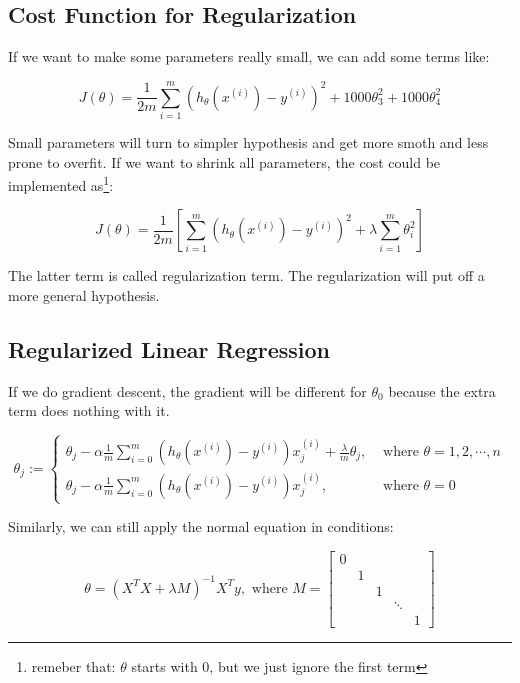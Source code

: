 \documentclass[black,simple]{../elegantbook}
\begin{document}
\subsection{Cost Function for Regularization}

If we want to make some parameters really small, we can add some terms like:

\[J(\theta) = \frac{1}{2m}\sum_{i=1}^m(h_\theta(x^(i)) - y^{(i)})^2
+ 1000 \theta_3^2 + 1000 \theta_4^2
\]

Small parameters will turn to simpler hypothesis and get more smoth and less prone to overfit. If we want to shrink all parameters, the cost could be implemented as\footnote{remeber that: \(\theta\) starts with 0, but we just ignore the first term }:

\[J(\theta) = \frac{1}{2m}\left[\sum_{i=1}^m(h_\theta(x^(i)) - y^{(i)})^2 + \lambda \sum_{i=1}^m\theta_i^2 \right]\]

The latter term is called regularization term. The regularization will put off a more general hypothesis.

\subsection{Regularized Linear Regression}

If we do gradient descent, the gradient will be different for \(\theta_0\) because the extra term does nothing with it.


\[\theta_j := \left\{
    \begin{aligned}
     \theta_j - \alpha \frac{1}{m} \sum_{i = 0}^m (h_\theta(x^{(i)}) - y^{(i)})x_j^{(i)}+ \frac{\lambda}{m}\theta_j, &\text{ where } \theta = 1, 2, \cdots , n\\
     \theta_j - \alpha \frac{1}{m} \sum_{i = 0}^m (h_\theta(x^{(i)}) - y^{(i)})x_j^{(i)}, &\text{ where } \theta = 0
\end{aligned}\right.\]

Similarly, we can still apply the normal equation in conditions: 

\[
    \theta = \left(X^T X + \lambda M \right)^{-1} X^T y, \text{ where } M = \left[\begin{matrix}
        0 & & & & \\
        & 1 & & & \\
        & & 1 & & \\
        & & & \ddots & \\
        & & & & 1
    \end{matrix}\right]
\]
\end{document}
